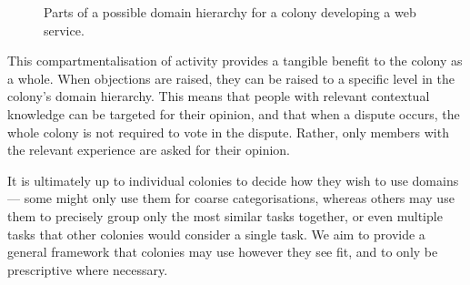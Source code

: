 \begin{figure}[h]
    \centering
 \caption{Parts of a possible domain hierarchy for a colony developing a web service.}
 \label{fig:domainhierarchysample}

\end{figure}

This compartmentalisation of activity provides a tangible benefit to the colony as a whole. When objections are raised, they can be raised to a specific level in the colony's domain hierarchy. This means that people with relevant contextual knowledge can be targeted for their opinion, and that when a dispute occurs, the whole colony is not required to vote in the dispute. Rather, only members with the relevant experience are asked for their opinion.

It is ultimately up to individual colonies to decide how they wish to use domains --- some might only use them for coarse categorisations, whereas others may use them to precisely group only the most similar tasks together, or even multiple tasks that other colonies would consider a single task. We aim to provide a general framework that colonies may use however they see fit, and to only be prescriptive where necessary.
